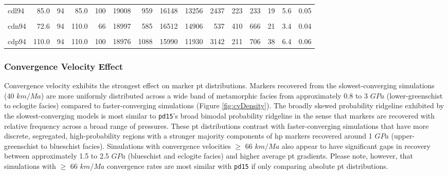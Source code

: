 \begin{landscape}
\begin{ThreePartTable}
\begin{longtable}[t]{lrrrrrrrrrrrrrr}
cdl94 & 85.0 & 94 & 85.0 & 100 & 19008 & 959 & 16148 & 13256 & 2437 & 223 & 233 & 19 & 5.6 & 0.05\\
\cellcolor{gray!6}{cdm94} & \cellcolor{gray!6}{44.0} & \cellcolor{gray!6}{94} & \cellcolor{gray!6}{110.0} & \cellcolor{gray!6}{40} & \cellcolor{gray!6}{19011} & \cellcolor{gray!6}{1763} & \cellcolor{gray!6}{15346} & \cellcolor{gray!6}{14369} & \cellcolor{gray!6}{77} & \cellcolor{gray!6}{703} & \cellcolor{gray!6}{198} & \cellcolor{gray!6}{11} & \cellcolor{gray!6}{10.3} & \cellcolor{gray!6}{0.69}\\
cdn94 & 72.6 & 94 & 110.0 & 66 & 18997 & 585 & 16512 & 14906 & 537 & 410 & 666 & 21 & 3.4 & 0.04\\
\cellcolor{gray!6}{cdo94} & \cellcolor{gray!6}{88.0} & \cellcolor{gray!6}{94} & \cellcolor{gray!6}{110.0} & \cellcolor{gray!6}{80} & \cellcolor{gray!6}{18988} & \cellcolor{gray!6}{451} & \cellcolor{gray!6}{16638} & \cellcolor{gray!6}{14395} & \cellcolor{gray!6}{1340} & \cellcolor{gray!6}{305} & \cellcolor{gray!6}{597} & \cellcolor{gray!6}{27} & \cellcolor{gray!6}{2.6} & \cellcolor{gray!6}{0.04}\\
cdp94 & 110.0 & 94 & 110.0 & 100 & 18976 & 1088 & 15990 & 11930 & 3142 & 211 & 706 & 38 & 6.4 & 0.06\\*
\end{longtable}
\end{ThreePartTable}
\endgroup{}
\end{landscape}

\endgroup

\hypertarget{convergence-velocity-effect}{%
\subsubsection{Convergence Velocity Effect}\label{convergence-velocity-effect}}

Convergence velocity exhibits the strongest effect on marker \gls{pt} distributions. Markers recovered from the slowest-converging simulations (40 \(km/Ma\)) are more uniformly distributed across a wide band of metamorphic facies from approximately 0.8 to 3 \(GPa\) (lower-greenschist to eclogite facies) compared to faster-converging simulations (Figure \ref{fig:cvDensity}). The broadly skewed probability ridgeline exhibited by the slowest-converging models is most similar to \texttt{pd15}'s broad bimodal probability ridgeline in the sense that markers are recovered with relative frequency across a broad range of pressures. These \gls{pt} distributions contrast with faster-converging simulations that have more discrete, segregated, high-probability regions with a stronger majority components of \gls{hp} markers recovered around 1 \(GPa\) (upper-greenschist to blueschist facies). Simulations with convergence velocities \(\geq\) 66 \(km/Ma\) also appear to have significant gaps in recovery between approximately 1.5 to 2.5 \(GPa\) (blueschist and eclogite facies) and higher average \gls{pt} gradients. Please note, however, that simulations with \(\geq\) 66 \(km/Ma\) convergence rates are most similar with \texttt{pd15} if only comparing absolute \gls{pt} distributions.



